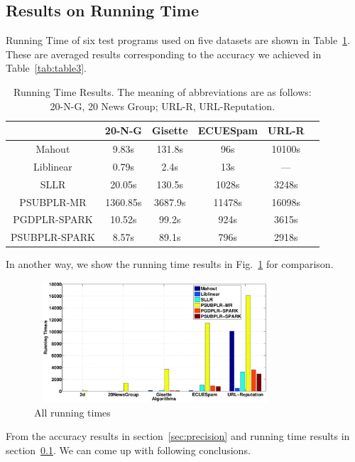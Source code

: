 \documentclass[10pt, conference, compsocconf]{IEEEtran}
\begin{document}
\subsection{Results on Running Time} \label{sec:time}

Running Time of six test programs used on five datasets are shown in Table~\ref{tab:table4}.
These are averaged results corresponding to the accuracy we achieved in Table~\ref{tab:table3}.
%
\begin{table}[h]
\centering
\caption{Running Time Results. The meaning of abbreviations are as follows: 20-N-G, 20 News Group; URL-R, URL-Reputation.}\label{tab:table4}\vspace{-0.3cm}
\begin{tabular}{|c|c|c|c|c|c|}
\hline
           & 20-N-G & Gisette & ECUESpam & URL-R \\
\hline
Mahout     & 9.83s & 131.8s & 96s & 10100s \\
\hline
Liblinear  & 0.79s & 2.4s & 13s & --- \\
\hline
SLLR       & 20.05s & 130.5s & 1028s & 3248s \\
\hline
PSUBPLR-MR & 1360.85s & 3687.9s & 11478s & 16098s \\
\hline
PGDPLR-SPARK & 10.52s & 99.2s & 924s & 3615s \\
\hline
PSUBPLR-SPARK & 8.57s & 89.1s & 796s & 2918s \\
\hline
\end{tabular}
\end{table}

In another way, we show the running time results in Fig.~\ref{fig:08} for comparison.
\begin{figure}[tb] \label{fig:08}
\center \includegraphics[height=4.5cm,width=9cm]{img/all_time.eps}\vspace{-0.4cm}
\caption{All running times}\vspace{-0.5cm}
\end{figure}

From the accuracy results in section~\ref{sec:precision} and running time results in section~\ref{sec:time}.
We can come up with following conclusions.
\end{document}
